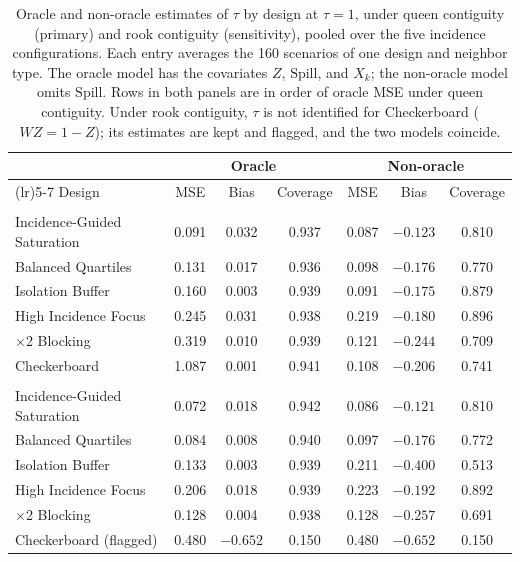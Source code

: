 \documentclass[11pt]{article}
\begin{document}
\begin{table}[!htb]

\small
\centering

\caption{Oracle and non-oracle estimates of $\tau$ by design at $\tau = 1$, under queen contiguity (primary) and rook contiguity (sensitivity), pooled over the five incidence configurations. Each entry averages the 160 scenarios of one design and neighbor type. The oracle model has the covariates $Z$, $\text{Spill}$, and $X_k$; the non-oracle model omits $\text{Spill}$. Rows in both panels are in order of oracle MSE under queen contiguity. Under rook contiguity, $\tau$ is not identified for Checkerboard ($WZ = 1 - Z$); its estimates are kept and flagged, and the two models coincide.}
\label{tab:oracle-nonoracle}

\begin{tabular}{>{\raggedright\arraybackslash}p{4.0cm}cccccc}

\toprule
& \multicolumn{3}{c}{Oracle} & \multicolumn{3}{c}{Non-oracle} \\
\cmidrule(lr){2-4}\cmidrule(lr){5-7}
Design & MSE & Bias & Coverage & MSE & Bias & Coverage \\

\midrule
\multicolumn{7}{l}{\textit{Queen contiguity (primary)}} \\
Incidence-Guided Saturation & 0.091 & 0.032 & 0.937 & 0.087 & $-0.123$ & 0.810 \\
Balanced Quartiles & 0.131 & 0.017 & 0.936 & 0.098 & $-0.176$ & 0.770 \\
Isolation Buffer & 0.160 & 0.003 & 0.939 & 0.091 & $-0.175$ & 0.879 \\
High Incidence Focus & 0.245 & 0.031 & 0.938 & 0.219 & $-0.180$ & 0.896 \\
2$\times$2 Blocking & 0.319 & 0.010 & 0.939 & 0.121 & $-0.244$ & 0.709 \\
Checkerboard & 1.087 & 0.001 & 0.941 & 0.108 & $-0.206$ & 0.741 \\

\midrule
\multicolumn{7}{l}{\textit{Rook contiguity (sensitivity)}} \\
Incidence-Guided Saturation & 0.072 & 0.018 & 0.942 & 0.086 & $-0.121$ & 0.810 \\
Balanced Quartiles & 0.084 & 0.008 & 0.940 & 0.097 & $-0.176$ & 0.772 \\
Isolation Buffer & 0.133 & 0.003 & 0.939 & 0.211 & $-0.400$ & 0.513 \\
High Incidence Focus & 0.206 & 0.018 & 0.939 & 0.223 & $-0.192$ & 0.892 \\
2$\times$2 Blocking & 0.128 & 0.004 & 0.938 & 0.128 & $-0.257$ & 0.691 \\
Checkerboard (flagged) & 0.480 & $-0.652$ & 0.150 & 0.480 & $-0.652$ & 0.150 \\

\bottomrule

\end{tabular}

\end{table}
\end{document}
